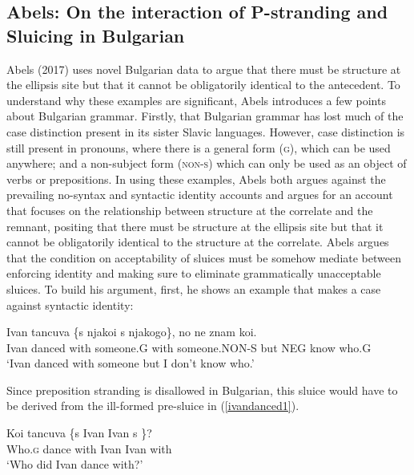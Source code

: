 \documentclass{turabian-researchpaper}
\begin{document}
\subsection{Abels: On the interaction of P-stranding and Sluicing in Bulgarian} 

Abels (2017) uses novel Bulgarian data to argue that there must be structure at the ellipsis site but that it cannot be obligatorily identical to the antecedent. To understand why these examples are significant, Abels introduces a few points about Bulgarian grammar. Firstly, that Bulgarian grammar has lost much of the case distinction present in its sister Slavic languages. However, case distinction is still present in pronouns, where there is a general form (\textsc{g}), which can be used anywhere; and a non-subject form (\textsc{non-s}) which can only be used as an object of verbs or prepositions. In using these examples, Abels both argues against the prevailing no-syntax and syntactic identity accounts and argues for an account that focuses on the relationship between structure at the correlate and the remnant, positing that there must be structure at the ellipsis site but that it cannot be obligatorily identical to the structure at the correlate. Abels argues that the condition on acceptability of sluices must be somehow mediate between enforcing identity and making sure to eliminate grammatically unacceptable sluices. 
To build his argument, first, he shows an example that makes a case against syntactic identity: 
\begin{exe}
\ex\label{ivandanced1}
\gll Ivan tancuva \{s njakoi \textbar s njakogo\}, no ne znam koi. \\
Ivan danced with someone.G with someone.NON-S but NEG know who.G \\
\trans `Ivan danced with someone but I don't know who.'
\end{exe}

Since preposition stranding is disallowed in Bulgarian, this sluice would have to be derived from the ill-formed pre-sluice in (\ref{ivandanced1}).

\begin{exe}
\ex\label{ivandanced2}
\gll *Koi tancuva \{s \underline{\hspace{1cm}} Ivan \textbar Ivan s \underline{\hspace{1cm}} \}? \\
Who.\textsc{g} dance with \hspace{1cm} Ivan Ivan with \\
\trans `Who did Ivan dance with?'
\end{exe}
\end{document}
